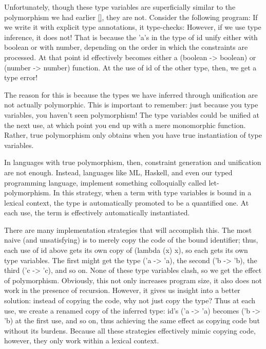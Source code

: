
Unfortunately, though these type variables are superficially similar to the polymorphism
we had earlier \ref{}, they are not. Consider the following program:
If we write it with explicit type annotations, it type-checks:
However, if we use type inference, it does not! That is because the 'a’s in the type
of id unify either with boolean or with number, depending on the order in which the
constraints are processed. At that point id effectively becomes either a (boolean ->
boolean) or (number -> number) function. At the use of id of the other type, then,
we get a type error!

The reason for this is because the types we have inferred through unification are not
actually polymorphic. This is important to remember: just because you type variables,
you haven’t seen polymorphism! The type variables could be unified at the next use,
at which point you end up with a mere monomorphic function. Rather, true polymorphism
only obtains when you have true instantiation of type variables.

In languages with true polymorphism, then, constraint generation and unification
are not enough. Instead, languages like ML, Haskell, and even our typed programming
language, implement something colloquially called let-polymorphism. In this strategy,
when a term with type variables is bound in a lexical context, the type is automatically
promoted to be a quantified one. At each use, the term is effectively automatically
instantiated.

There are many implementation strategies that will accomplish this. The most naive
(and unsatisfying) is to merely copy the code of the bound identifier; thus, each use of
id above gets its own copy of (lambda (x) x), so each gets its own type variables.
The first might get the type ('a -> 'a), the second ('b -> 'b), the third ('c ->
'c), and so on. None of these type variables clash, so we get the effect of polymorphism.
Obviously, this not only increases program size, it also does not work in the
presence of recursion. However, it gives us insight into a better solution: instead of
copying the code, why not just copy the type? Thus at each use, we create a renamed
copy of the inferred type: id’s ('a -> 'a) becomes ('b -> 'b) at the first use, and
so on, thus achieving the same effect as copying code but without its burdens. Because
all these strategies effectively mimic copying code, however, they only work within a
lexical context.

\secup